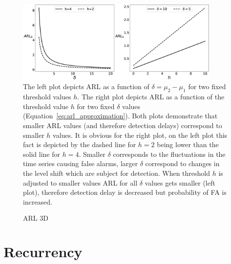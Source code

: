 \documentclass[doctoral,utf8,lot,loar,lof,shortloft,index]{jydiss}
\begin{document}
\begin{figure}[!htb]
	\centering
	\includegraphics[width=0.9\textwidth]{images_ecmplpkdd/arl.eps}
	\caption{
    The left plot depicts ARL as a function of $\delta = \mu_2-\mu_1$ for two fixed threshold values $h$. The right plot depicts ARL as a function of the threshold value $h$ for two fixed $\delta$ values (Equation~\ref{eq:arl_approximation}).
    Both plots demonstrate that smaller ARL values (and therefore detection delays) correspond to smaller $h$ values. It is obvious for the right plot, on the left plot this fact is depicted by the dashed line for $h=2$ being lower than the solid line for $h=4$.
    Smaller $\delta$ corresponds to the fluctuations in the time series causing false alarms, larger $\delta$ correspond to changes in the level shift which are subject for detection.
    When threshold $h$ is adjusted to smaller values ARL for all $\delta$ values gets smaller (left plot), therefore detection delay is decreased but probability of FA is increased.
}\label{fig:arl}
\end{figure}
\begin{figure}[!htb]

\caption{ARL 3D}\label{fig:arl3d}
\end{figure}


\chapter{Recurrency}
\end{document}

